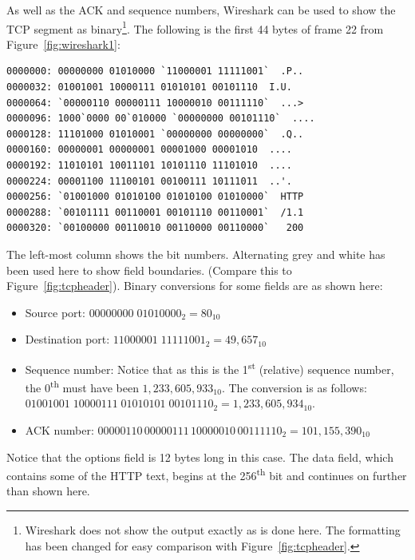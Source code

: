 \documentclass[11pt,a4paper]{report}
\begin{document}
	As well as the ACK and sequence numbers, Wireshark can be used to show the TCP segment as binary\footnote{Wireshark does not show the output exactly as is done here. The formatting has been changed for easy comparison with Figure~\ref{fig:tcpheader}.}. The following is the first 44 bytes of frame 22 from Figure~\ref{fig:wireshark1}:
	{
		\setlength\topsep{0pt}
		\setlength\parskip{0pt}
		\begin{center}
		\begin{minipage}{0.7501\textwidth}
		\begin{lstlisting}[style=highlightable, frame=none, numbers=none, xleftmargin=0ex, xrightmargin=0ex]
0000000: 00000000 01010000 `11000001 11111001`  .P..
0000032: 01001001 10000111 01010101 00101110  I.U.
0000064: `00000110 00000111 10000010 00111110`  ...>
0000096: 1000`0000 00`010000 `00000000 00101110`  ....
0000128: 11101000 01010001 `00000000 00000000`  .Q..
0000160: 00000001 00000001 00001000 00001010  ....
0000192: 11010101 10011101 10101110 11101010  ....
0000224: 00001100 11100101 00100111 10111011  ..'.
0000256: `01001000 01010100 01010100 01010000`  HTTP
0000288: `00101111 00110001 00101110 00110001`  /1.1
0000320: `00100000 00110010 00110000 00110000`   200
		\end{lstlisting}
		\end{minipage}
		\end{center}
	}\noindent
	The left-most column shows the bit numbers. Alternating grey and white has been used here to show field boundaries. (Compare this to Figure~\ref{fig:tcpheader}). Binary conversions for some fields are as shown here:
	\begin{itemize}
		\item Source port: $00000000\;01010000_2 = 80_{10}$
		\item Destination port: $11000001\;11111001_2 = 49,\!657_{10}$
		\item Sequence number: Notice that as this is the 1\textsuperscript{st} (relative) sequence number, the 0\textsuperscript{th} must have been $1,\!233,\!605,\!933_{10}$. The conversion is as follows: $01001001\;10000111\;01010101\;00101110_2 = 1,\!233,\!605,\!934_{10}$.
		\item ACK number: $\!00000110\,00000111\,10000010\,00111110_2 = 101,\!155,\!390_{10}$
	\end{itemize}
	Notice that the options field is 12 bytes long in this case. The data field, which contains some of the HTTP text, begins at the 256\textsuperscript{th} bit and continues on further than shown here.
	
\end{document}
